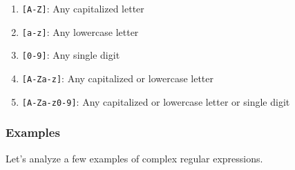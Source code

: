 \documentclass[
  letterpaper,
  DIV=11,
  numbers=noendperiod]{scrreprt}
\providecommand{\tightlist}{%
  \setlength{\itemsep}{0pt}\setlength{\parskip}{0pt}}\usepackage{longtable,booktabs,array}
\begin{document}
\begin{enumerate}
\def\labelenumi{\arabic{enumi}.}
\tightlist
\item
  \texttt{{[}A-Z{]}}: Any capitalized letter
\item
  \texttt{{[}a-z{]}}: Any lowercase letter
\item
  \texttt{{[}0-9{]}}: Any single digit
\item
  \texttt{{[}A-Za-z{]}}: Any capitalized or lowercase letter
\item
  \texttt{{[}A-Za-z0-9{]}}: Any capitalized or lowercase letter or
  single digit
\end{enumerate}

\subsubsection{Examples}\label{examples-1}

Let's analyze a few examples of complex regular expressions.
\end{document}
